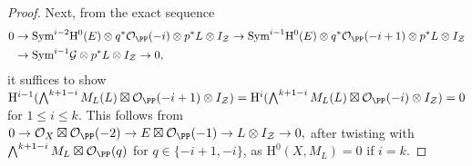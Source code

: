 \begin{proof}
Next, from the exact sequence
\begin{align*}
0 &\to \mathrm{Sym}^{i-2} \mathrm{H}^0(E) \otimes q^*\mathcal{O}_{\PP}(-i) \otimes p^*L \otimes I_{\mathcal{Z}} \to \mathrm{Sym}^{i-1}\mathrm{H}^0(E) \otimes q^*\mathcal{O}_{\PP}(-i+1) \otimes p^*L \otimes I_{\mathcal{Z}}\\ &\to \mathrm{Sym}^{i-1}\mathcal{G} \otimes p^*L \otimes I_{\mathcal{Z}}\to 0,
\end{align*}
it suffices to show $\mathrm{H}^{i-1}(\bigwedge^{k+1-i} M_L (L)\boxtimes \mathcal{O}_{\PP}(-i+1)\otimes I_{\mathcal{Z}})=\mathrm{H}^{i}(\bigwedge^{k+1-i} M_L(L) \boxtimes \mathcal{O}_{\PP}(-i) \otimes I_{\mathcal{Z}})=0$ for $1 \leq i \leq k.$ This follows from $0 \to \mathcal{O}_X \boxtimes \mathcal{O}_{\PP}(-2) \to E \boxtimes \mathcal{O}_{\PP}(-1) \to L \otimes I_{\mathcal{Z}} \to 0,$ after twisting with $\bigwedge^{k+1-i} M_L \boxtimes \mathcal{O}_{\PP}(q)$ for $q \in \{-i+1,-i \}$, as $\mathrm{H}^0(X,M_L)=0$ if $i=k$. \end{proof}
